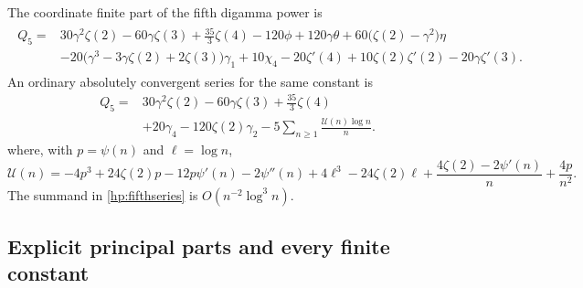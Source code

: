\begin{theorem}\label{hp:fifth}
The coordinate finite part of the fifth digamma power is
\begin{align}\label{hp:fifthmain}
 \boxed{\begin{aligned}
 Q_5={}&30\gamma^2\zeta(2)-60\gamma\zeta(3)+\frac{35}{3}\zeta(4)
       -120\phi+120\gamma\theta
       +60\bigl(\zeta(2)-\gamma^2\bigr)\eta\\
 &-20\bigl(\gamma^3-3\gamma\zeta(2)+2\zeta(3)\bigr)\gamma_1
       +10\chi_4-20\zeta'(4)
       +10\zeta(2)\zeta'(2)-20\gamma\zeta'(3).
 \end{aligned}}
\end{align}
An ordinary absolutely convergent series for the same constant is
\begin{equation}\label{hp:fifthseries}
 \boxed{\begin{aligned}
 Q_5={}&30\gamma^2\zeta(2)-60\gamma\zeta(3)+\frac{35}{3}\zeta(4)\\
      &+20\gamma_4-120\zeta(2)\gamma_2
       -5\sum_{n\ge1}\frac{\mathcal U(n)\log n}{n}.
 \end{aligned}}
\end{equation}
where, with $p=\psi(n)$ and $\ell=\log n$,
\begin{equation}\label{hp:Un}
 \mathcal U(n)=-4p^3+24\zeta(2)p-12p\psi'(n)-2\psi''(n)
    +4\ell^3-24\zeta(2)\ell
    +\frac{4\zeta(2)-2\psi'(n)}n+\frac{4p}{n^2}.
\end{equation}
The summand in \eqref{hp:fifthseries} is
$O(n^{-2}\log^3n)$.
\end{theorem}

\subsection{Explicit principal parts and every finite constant}

